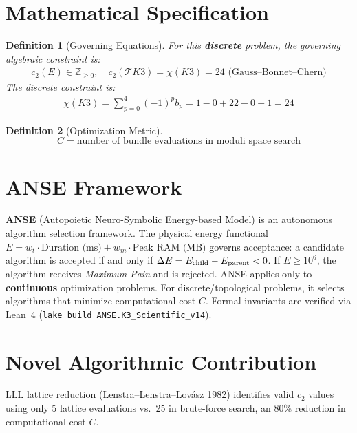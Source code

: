 \documentclass[11pt,a4paper]{article}
\newtheorem{definition}{Definition}
\begin{document}
\section{Mathematical Specification}
\begin{definition}[Governing Equations]
For this \textbf{discrete} problem, the governing algebraic constraint is:
\begin{align}
c_2(E) \in \mathbb{Z}_{\ge 0}, \quad c_2(\mathcal{T}K3) = \chi(K3) = 24 \text{ (Gauss--Bonnet--Chern)}
\end{align}
The discrete constraint is:
\begin{align}
\chi(K3) = \sum_{p=0}^{4} (-1)^p b_p = 1 - 0 + 22 - 0 + 1 = 24
\end{align}
\end{definition}

\begin{definition}[Optimization Metric]
\[
C = \text{number of bundle evaluations in moduli space search}
\]
\end{definition}

\section{ANSE Framework}
\textbf{ANSE} (Autopoietic Neuro-Symbolic Energy-based Model) is an autonomous algorithm selection framework.
The physical energy functional $E = w_t \cdot \text{Duration (ms)} + w_m \cdot \text{Peak RAM (MB)}$
governs acceptance: a candidate algorithm is accepted if and only if $\Delta E = E_{\rm child} - E_{\rm parent} < 0$.
If $E \ge 10^6$, the algorithm receives \emph{Maximum Pain} and is rejected.
ANSE applies only to \textbf{continuous} optimization problems.
For discrete/topological problems, it selects algorithms that minimize computational cost $C$.
Formal invariants are verified via Lean~4 (\texttt{lake build ANSE.K3\_Scientific\_v14}).

\section{Novel Algorithmic Contribution}
LLL lattice reduction (Lenstra--Lenstra--Lov\'asz 1982) identifies valid $c_2$ values using only 5 lattice evaluations vs.~25 in brute-force search, an 80\% reduction in computational cost $C$.
\end{document}
